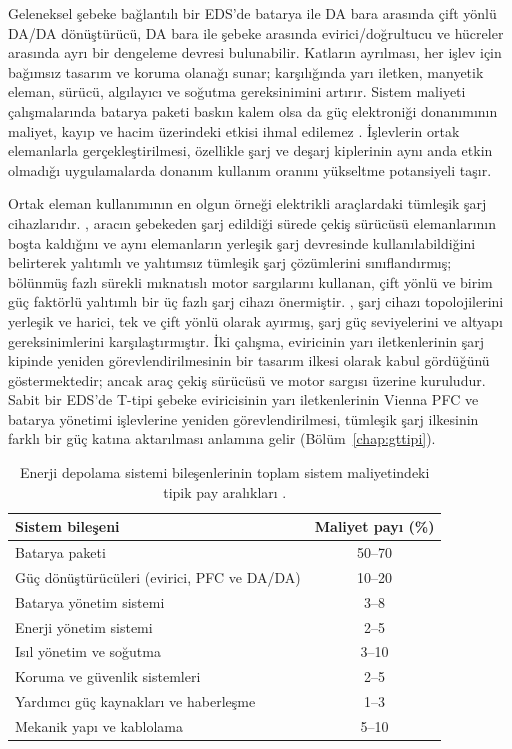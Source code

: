 Geleneksel şebeke bağlantılı bir EDS'de batarya ile DA bara arasında çift yönlü DA/DA dönüştürücü, DA bara ile şebeke arasında evirici/doğrultucu ve hücreler arasında ayrı bir dengeleme devresi bulunabilir. Katların ayrılması, her işlev için bağımsız tasarım ve koruma olanağı sunar; karşılığında yarı iletken, manyetik eleman, sürücü, algılayıcı ve soğutma gereksinimini artırır. Sistem maliyeti çalışmalarında batarya paketi baskın kalem olsa da güç elektroniği donanımının maliyet, kayıp ve hacim üzerindeki etkisi ihmal edilemez \citep{Ramasamy2023,Lazard2024}. İşlevlerin ortak elemanlarla gerçekleştirilmesi, özellikle şarj ve deşarj kiplerinin aynı anda etkin olmadığı uygulamalarda donanım kullanım oranını yükseltme potansiyeli taşır.

Ortak eleman kullanımının en olgun örneği elektrikli araçlardaki tümleşik şarj cihazlarıdır. \citet{Haghbin2013}, aracın şebekeden şarj edildiği sürede çekiş sürücüsü elemanlarının boşta kaldığını ve aynı elemanların yerleşik şarj devresinde kullanılabildiğini belirterek yalıtımlı ve yalıtımsız tümleşik şarj çözümlerini sınıflandırmış; bölünmüş fazlı sürekli mıknatıslı motor sargılarını kullanan, çift yönlü ve birim güç faktörlü yalıtımlı bir üç fazlı şarj cihazı önermiştir. \citet{Yilmaz2013}, şarj cihazı topolojilerini yerleşik ve harici, tek ve çift yönlü olarak ayırmış, şarj güç seviyelerini ve altyapı gereksinimlerini karşılaştırmıştır. İki çalışma, eviricinin yarı iletkenlerinin şarj kipinde yeniden görevlendirilmesinin bir tasarım ilkesi olarak kabul gördüğünü göstermektedir; ancak araç çekiş sürücüsü ve motor sargısı üzerine kuruludur. Sabit bir EDS'de T-tipi şebeke eviricisinin yarı iletkenlerinin Vienna PFC ve batarya yönetimi işlevlerine yeniden görevlendirilmesi, tümleşik şarj ilkesinin farklı bir güç katına aktarılması anlamına gelir (Bölüm~\ref{chap:gttipi}).

\begin{table}[htbp]
  \centering
  \caption{Enerji depolama sistemi bileşenlerinin toplam sistem maliyetindeki tipik pay aralıkları \citep{Ramasamy2023,Lazard2024}.}
  \label{tab:eds-maliyet-dagilimi}
  \begin{tabular}{>{\raggedright\arraybackslash}p{} c}
    \toprule
    \textbf{Sistem bileşeni} & \textbf{Maliyet payı (\%)} \\
    \midrule
    Batarya paketi & 50--70 \\
    Güç dönüştürücüleri (evirici, PFC ve DA/DA) & 10--20 \\
    Batarya yönetim sistemi & 3--8 \\
    Enerji yönetim sistemi & 2--5 \\
    Isıl yönetim ve soğutma & 3--10 \\
    Koruma ve güvenlik sistemleri & 2--5 \\
    Yardımcı güç kaynakları ve haberleşme & 1--3 \\
    Mekanik yapı ve kablolama & 5--10 \\
    \bottomrule
  \end{tabular}
\end{table}


